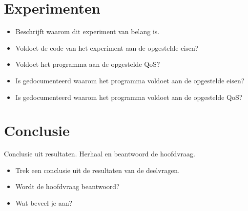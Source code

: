 \documentclass[a4paper, 11pt, oneside]{report}
\begin{document}
\chapter{Experimenten}
\begin{itemize}
\item Beschrijft waarom dit experiment van belang is.
\item Voldoet de code van het experiment aan de opgestelde eisen?
\item Voldoet het programma aan de opgestelde QoS?
\item Is gedocumenteerd waarom het programma voldoet aan de opgestelde eisen?
\item Is gedocumenteerd waarom het programma voldoet aan de opgestelde QoS?
\end{itemize}

\chapter{Conclusie}
\label{chapter:conclusie}
Conclusie uit resultaten. Herhaal en beantwoord de hoofdvraag.
\begin{itemize}
\item Trek een conclusie uit de resultaten van de deelvragen.
\item Wordt de hoofdvraag beantwoord?
\item Wat beveel je aan?
\end{itemize}





\clearpage
\appendix
\end{document}
